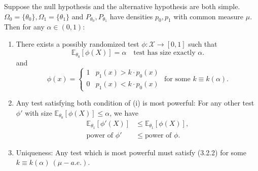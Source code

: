 \documentclass[a4paper]{article}
\begin{document}
\begin{thm}
	Suppose the null hypothesis and the alternative hypothesis are both simple. $\Omega_0 = \{\theta_0\},\Omega_1 = \{\theta_1\}$ and $P_{\theta_0}, P_{\theta_1}$ have densities $p_0,p_1$ with common measure $\mu$. Then for any $\alpha \in (0,1)$:
	\begin{enumerate}
		\item There exists a possibly randomized test $\phi: \mathcal{X} \to [0,1]$ such that
		\begin{equation}
			\mathbb{E}_{\theta_0}[\phi(X)] = \alpha \quad \text{test has size exactly } \alpha.
		\end{equation}
		and 
		\begin{equation}
			\phi (x) =\left\{ 
			\begin{array}{ll}
				1 & p_1(x) > k \cdot p_0(x) \\
				0 & p_1(x) < k \cdot p_0(x)
			\end{array} \right. \text{ for some } k \equiv k(\alpha).
		\end{equation} 
		\item Any test satisfying both condition of (i) is most powerful: For any other test $\phi'$ with size $\mathbb{E}_{\theta_0}[\phi(X)] \leq \alpha$, we have
		\begin{equation}
			\begin{aligned}
				\mathbb{E}_{\theta_1}[\phi'(X)] & \leq \mathbb{E}_{\theta_1}[\phi(X)], \\
				\text{power of $\phi'$} & \leq \text{power of $\phi$}.
			\end{aligned}
		\end{equation}
		\item Uniqueness: Any test which is most powerful must satisfy (3.2.2) for some $k \equiv k(\alpha) \ (\mu-a.e.)$.
	\end{enumerate}
\end{thm}
\end{document}

